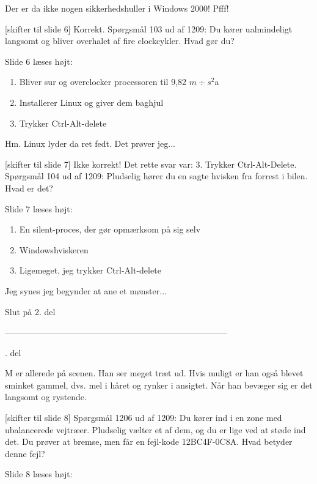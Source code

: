 \documentclass[danish]{article}
\begin{document}
\begin{sketch}
 Der er da ikke nogen sikkerhedshuller i Windows 2000! Pfff!

[skifter til slide 6] Korrekt. Spørgsmål 103 ud af 1209: Du kører
ualmindeligt langsomt og bliver overhalet af fire clockcykler. Hvad gør du?

\scene Slide 6 læses højt:

\begin{enumerate}
\item Bliver sur og overclocker processoren til 9,82 $m \div s^2$a
\item Installerer Linux og giver dem baghjul
\item Trykker Ctrl-Alt-delete
\end{enumerate}

 Hm. Linux lyder da ret fedt. Det prøver jeg... 

[skifter til slide 7] Ikke korrekt! Det rette svar var: 3. Trykker
Ctrl-Alt-Delete. Spørgsmål 104 ud af 1209: Pludselig hører du en sagte hvisken
fra forrest i bilen. Hvad er det? 

\scene Slide 7 læses højt:

\begin{enumerate}
\item En silent-proces, der gør opmærksom på sig selv
\item Windowshviskeren
\item Ligemeget, jeg trykker Ctrl-Alt-delete
\end{enumerate}

 Jeg synes jeg begynder at ane et mønster... 

\scene Slut på 2. del

\scene ------------------------------------------------------------------------------

. del

\scene M er allerede på scenen. Han ser meget træt ud. Hvis muligt er han også
blevet sminket gammel, dvs. mel i håret og rynker i ansigtet. Når han bevæger
sig er det langsomt og rystende.

[skifter til slide 8] Spørgsmål 1206 ud af 1209: Du kører ind i en zone
med ubalancerede vejtræer. Pludselig vælter et af dem, og du er lige ved at
støde ind det. Du prøver at bremse, men får en fejl-kode 12BC4F-0C8A. Hvad
betyder denne fejl? 

\scene Slide 8 læses højt:
        

\end{sketch}
\end{document}
